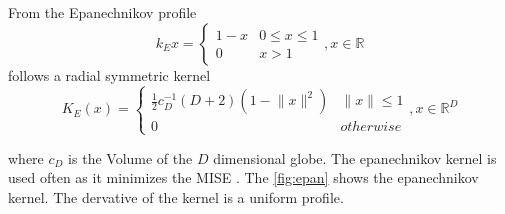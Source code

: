 From the Epanechnikov profile
\begin{equation}\label{eq:epa}
  k_E{x} = \begin{cases}
    1 - x &  0 \leq x \leq 1\\
    0 & x > 1
  \end{cases}, x \in \mathbb{R}
\end{equation}
follows a radial symmetric kernel
\begin{equation}\label{eq:epak}
  K_E(x) = \begin{cases}
    \frac{1}{2}c_D^{-1}(D+2)(1-\lVert x \rVert^2) &  \lVert x \rVert \leq 1 \\
    0 & \mathit{otherwise}
  \end{cases}, x \in \mathbb{R}^D
\end{equation}

where $c_D$ is the Volume of the $D$ dimensional globe. The
epanechnikov kernel is used often as it minimizes the \gls{MISE}
\citep{citeulike:5813637}. The \autoref{fig:epan} shows the
epanechnikov kernel. The dervative of the kernel is a uniform profile.



